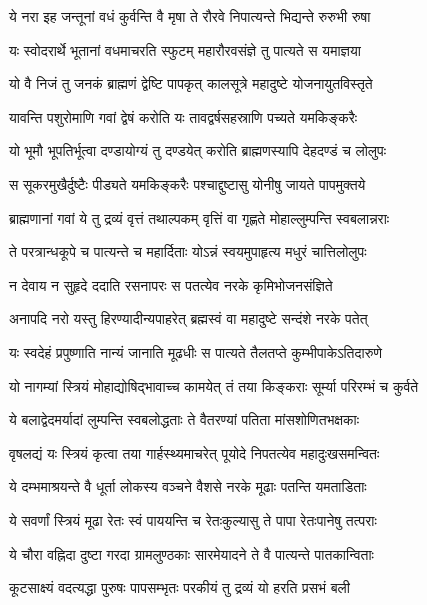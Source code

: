 \twolineshloka
{ये नरा इह जन्तूनां वधं कुर्वन्ति वै मृषा}
{ते रौरवे निपात्यन्ते भिद्यन्ते रुरुभी रुषा}%

\twolineshloka
{यः स्वोदरार्थे भूतानां वधमाचरति स्फुटम्}
{महारौरवसंज्ञे तु पात्यते स यमाज्ञया}%

\twolineshloka
{यो वै निजं तु जनकं ब्राह्मणं द्वेष्टि पापकृत्}
{कालसूत्रे महादुष्टे योजनायुतविस्तृते}%

\twolineshloka
{यावन्ति पशुरोमाणि गवां द्वेषं करोति यः}
{तावद्वर्षसहस्राणि पच्यते यमकिङ्करैः}%

\twolineshloka
{यो भूमौ भूपतिर्भूत्वा दण्डायोग्यं तु दण्डयेत्}
{करोति ब्राह्मणस्यापि देहदण्डं च लोलुपः}%

\twolineshloka
{स सूकरमुखैर्दुष्टैः पीड्यते यमकिङ्करैः}
{पश्चाद्दुष्टासु योनीषु जायते पापमुक्तये}%

\twolineshloka
{ब्राह्मणानां गवां ये तु द्रव्यं वृत्तं तथाल्पकम्}
{वृत्तिं वा गृह्णते मोहाल्लुम्पन्ति स्वबलान्नराः}%

\twolineshloka
{ते परत्रान्धकूपे च पात्यन्ते च महार्दिताः}
{योऽन्नं स्वयमुपाहृत्य मधुरं चात्तिलोलुपः}%

\twolineshloka
{न देवाय न सुहृदे ददाति रसनापरः}
{स पतत्येव नरके कृमिभोजनसंज्ञिते}%

\twolineshloka
{अनापदि नरो यस्तु हिरण्यादीन्यपाहरेत्}
{ब्रह्मस्वं वा महादुष्टे सन्दंशे नरके पतेत्}%

\twolineshloka
{यः स्वदेहं प्रपुष्णाति नान्यं जानाति मूढधीः}
{स पात्यते तैलतप्ते कुम्भीपाकेऽतिदारुणे}%

\twolineshloka
{यो नागम्यां स्त्रियं मोहाद्योषिद्भावाच्च कामयेत्}
{तं तया किङ्कराः सूर्म्या परिरम्भं च कुर्वते}%

\twolineshloka
{ये बलाद्वेदमर्यादां लुम्पन्ति स्वबलोद्धताः}
{ते वैतरण्यां पतिता मांसशोणितभक्षकाः}%

\twolineshloka
{वृषलद्यं यः स्त्रियं कृत्वा तया गार्हस्थ्यमाचरेत्}
{पूयोदे निपतत्येव महादुःखसमन्वितः}%

\twolineshloka
{ये दम्भमाश्रयन्ते वै धूर्ता लोकस्य वञ्चने}
{वैशसे नरके मूढाः पतन्ति यमताडिताः}%

\twolineshloka
{ये सवर्णां स्त्रियं मूढा रेतः स्वं पाययन्ति च}
{रेतःकुल्यासु ते पापा रेतःपानेषु तत्पराः}%

\twolineshloka
{ये चौरा वह्निदा दुष्टा गरदा ग्रामलुण्ठकाः}
{सारमेयादने ते वै पात्यन्ते पातकान्विताः}%

\twolineshloka
{कूटसाक्ष्यं वदत्यद्धा पुरुषः पापसम्भृतः}
{परकीयं तु द्रव्यं यो हरति प्रसभं बली}%

